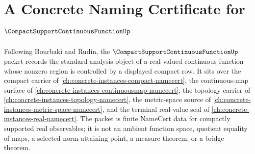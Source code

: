 \chapter{A Concrete Naming Certificate for $\CompactSupportContinuousFunctionUp$}
\label{ch:concrete-instances-compact-support-continuous-function-namecert}

Following Bourbaki and Rudin, the $\CompactSupportContinuousFunctionUp$ packet records the standard analysis object of a real-valued continuous function whose nonzero region is controlled by a displayed compact row. It sits over the compact carrier of \autoref{ch:concrete-instances-compact-namecert}, the continuous-map surface of \autoref{ch:concrete-instances-continuousmap-namecert}, the topology carrier of \autoref{ch:concrete-instances-topology-namecert}, the metric-space source of \autoref{ch:concrete-instances-metric-space-namecert}, and the terminal real-value seal of \autoref{ch:concrete-instances-real-namecert}. The packet is finite NameCert data for compactly supported real observables; it is not an ambient function space, quotient equality of maps, a selected norm-attaining point, a measure theorem, or a bridge theorem.

